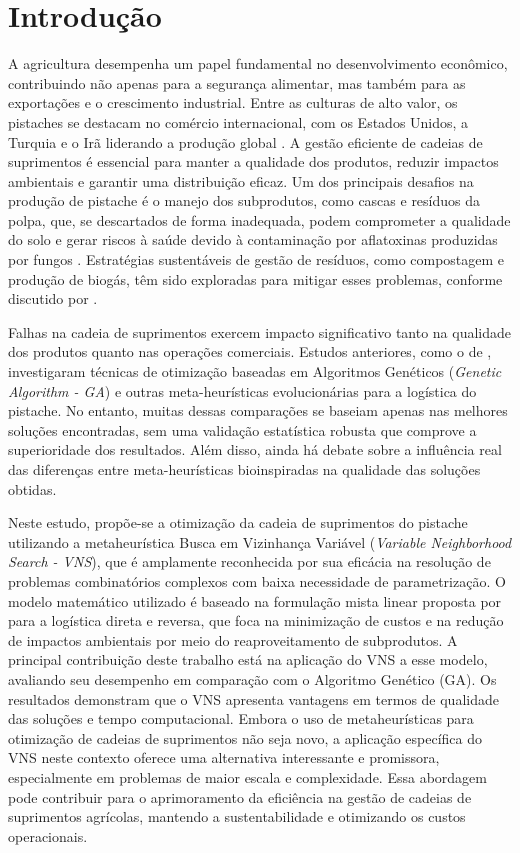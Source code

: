 \documentclass[conference]{IEEEtran}
\begin{document}
\section{Introdução}
\label{sec:intro1}
A agricultura desempenha um papel fundamental no desenvolvimento econômico, contribuindo não apenas para a segurança alimentar, mas também para as exportações e o crescimento industrial. 
Entre as culturas de alto valor, os pistaches se destacam no comércio internacional, com os Estados Unidos, a Turquia e o Irã liderando a produção global \cite{b22}. 
A gestão eficiente de cadeias de suprimentos é essencial para manter a qualidade dos produtos, reduzir impactos ambientais e garantir uma distribuição eficaz. Um dos principais desafios na 
produção de pistache é o manejo dos subprodutos, como cascas e resíduos da polpa, que, se descartados de forma inadequada, podem comprometer a qualidade do solo e gerar riscos à saúde 
devido à contaminação por aflatoxinas produzidas por fungos \cite{b26}. Estratégias sustentáveis de gestão de resíduos, como compostagem e produção de biogás, têm sido 
exploradas para mitigar esses problemas, conforme discutido por \cite{b6}.

Falhas na cadeia de suprimentos exercem impacto significativo tanto na qualidade dos produtos quanto nas operações comerciais. Estudos anteriores, como o de \cite{b2}, investigaram técnicas 
de otimização baseadas em Algoritmos Genéticos (\textit{Genetic Algorithm - GA}) e outras meta-heurísticas evolucionárias para a logística do pistache. No entanto, muitas dessas comparações se baseiam apenas 
nas melhores soluções encontradas, sem uma validação estatística robusta que comprove a superioridade dos resultados. Além disso, ainda há debate sobre a influência real das 
diferenças entre meta-heurísticas bioinspiradas na qualidade das soluções obtidas.

Neste estudo, propõe-se a otimização da cadeia de suprimentos do pistache utilizando a metaheurística Busca em Vizinhança Variável (\textit{Variable Neighborhood Search - VNS}), que é amplamente reconhecida 
por sua eficácia na resolução de problemas combinatórios complexos com baixa necessidade de parametrização. O modelo matemático utilizado é baseado na formulação mista linear proposta por \cite{b2} 
para a logística direta e reversa, que foca na minimização de custos e na redução de impactos ambientais por meio do reaproveitamento de subprodutos. A principal contribuição deste trabalho está na 
aplicação do VNS a esse modelo, avaliando seu desempenho em comparação com o Algoritmo Genético (GA). Os resultados demonstram que o VNS apresenta vantagens em termos de qualidade 
das soluções e tempo computacional. Embora o uso de metaheurísticas para otimização de cadeias de suprimentos não seja novo, a aplicação específica do VNS neste contexto oferece uma alternativa 
interessante e promissora, especialmente em problemas de maior escala e complexidade. Essa abordagem pode contribuir para o aprimoramento da eficiência na gestão de cadeias de suprimentos agrícolas, 
mantendo a sustentabilidade e otimizando os custos operacionais.
\end{document}
